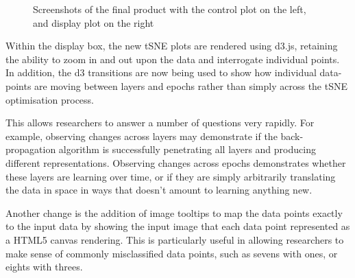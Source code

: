 \documentclass[a4paper,11pt,titlepage]{article}
\begin{document}
	\begin{figure}[H]
    			\centering	
    			\qquad

    			\caption{Screenshots of the final product with the control plot on the left, and display plot on the right}%
    			\label{fig:pca_varimax}
	\end{figure}
	
	Within the display box, the new tSNE plots are rendered using d3.js, retaining the ability to zoom in and out upon the data and interrogate individual points. In addition, the d3 transitions are now being used to show how individual data-points are moving between layers and epochs rather than simply across the tSNE optimisation process.
	\par 
	This allows researchers to answer a number of questions very rapidly. For example, observing changes across layers may demonstrate if the back-propagation algorithm is successfully penetrating all layers and producing different representations. Observing changes across epochs demonstrates whether these layers are learning over time, or if they are simply arbitrarily translating the data in space in ways that doesn't amount to learning anything new.
	\par 
	Another change is the addition of image tooltips to map the data points exactly to the input data by showing the input image that each data point represented as a HTML5 canvas rendering. This is particularly useful in allowing researchers to make sense of commonly misclassified data points, such as sevens with ones, or eights with threes.
	
\end{document}

